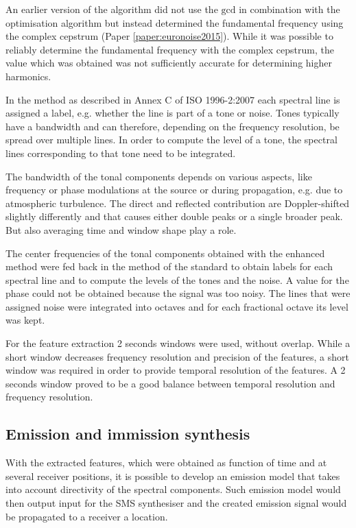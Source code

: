 An earlier version of the algorithm did not use the $\mathrm{gcd}$ in
combination with the optimisation algorithm but instead determined the
fundamental frequency using the complex cepstrum (Paper \ref{paper:euronoise2015}).
While it was possible to reliably determine the fundamental frequency with the
complex cepstrum, the value which was obtained was not sufficiently accurate
for determining higher harmonics.

In the method as described in Annex C of ISO 1996-2:2007 each spectral line is
assigned a label, e.g. whether the line is part of a tone or noise. Tones
typically have a bandwidth and can therefore, depending on the frequency
resolution, be spread over multiple lines. In order to compute the level of a
tone, the spectral lines corresponding to that tone need to be integrated.

The bandwidth of the tonal components depends on various aspects, like frequency
or phase modulations at the source or during propagation, e.g. due to
atmospheric turbulence. The direct and reflected contribution are
Doppler-shifted slightly differently and that causes either double peaks or a
single broader peak. But also averaging time and window shape play a role.

The center frequencies of the tonal components obtained with the enhanced method
were fed back in the method of the standard to obtain labels for each spectral
line and to compute the levels of the tones and the noise.
A value for the phase could not be obtained because the signal was too noisy.
The lines that were assigned noise were integrated into  octaves and for each
fractional octave its level was kept.

For the feature extraction 2 seconds windows were used, without overlap.
While a short window decreases frequency resolution and precision of the features, a short
window was required in order to provide temporal resolution of the features.
A 2 seconds window proved to be a good balance between temporal resolution
and frequency resolution.


\subsection{Emission and immission synthesis}\label{sec:tool:synthesis:synthesis}
With the extracted features, which were obtained as function of time and at
several receiver positions, it is possible to develop an emission model that
takes into account directivity of the spectral components. Such emission model
would then output input for the SMS synthesiser and the created emission signal
would be propagated to a receiver a location.

